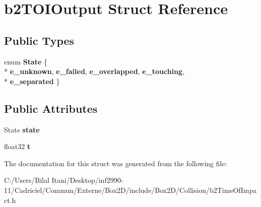\hypertarget{structb2_t_o_i_output}{}\section{b2\+T\+O\+I\+Output Struct Reference}
\label{structb2_t_o_i_output}
\subsection*{Public Types}
\begin{DoxyCompactItemize}
\item 
enum {\bfseries State} \{ \\*
{\bfseries e\+\_\+unknown}, 
{\bfseries e\+\_\+failed}, 
{\bfseries e\+\_\+overlapped}, 
{\bfseries e\+\_\+touching}, 
\\*
{\bfseries e\+\_\+separated}
 \}\hypertarget{structb2_t_o_i_output_a12c3cf4dc0551f5c8249dc1dd867959a}{}\label{structb2_t_o_i_output_a12c3cf4dc0551f5c8249dc1dd867959a}

\end{DoxyCompactItemize}
\subsection*{Public Attributes}
\begin{DoxyCompactItemize}
\item 
State {\bfseries state}\hypertarget{structb2_t_o_i_output_aaacbf28f437b965ffecabf1407a77915}{}\label{structb2_t_o_i_output_aaacbf28f437b965ffecabf1407a77915}

\item 
float32 {\bfseries t}\hypertarget{structb2_t_o_i_output_a94f8b756e060892226ec006db4be7ee3}{}\label{structb2_t_o_i_output_a94f8b756e060892226ec006db4be7ee3}

\end{DoxyCompactItemize}


The documentation for this struct was generated from the following file\+:\begin{DoxyCompactItemize}
\item 
C\+:/\+Users/\+Bilal Itani/\+Desktop/inf2990-\/11/\+Cadriciel/\+Commun/\+Externe/\+Box2\+D/include/\+Box2\+D/\+Collision/b2\+Time\+Of\+Impact.\+h\end{DoxyCompactItemize}
